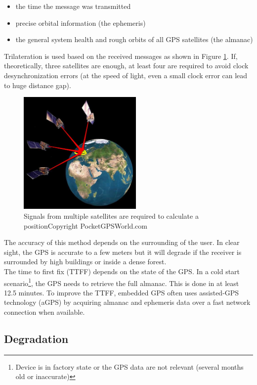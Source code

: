 \begin{itemize}
\item the time the message was transmitted
\item precise orbital information (the ephemeris)
\item the general system health and rough orbits of all GPS satellites (the almanac)
\end{itemize}

Trilateration is used based on the received messages as shown in Figure \ref{fig:gps-earth}.
If, theoretically, three satellites are enough, at least four are required to avoid clock desynchronization errors (at the speed of light, even a small clock error can lead to huge distance gap).\\

\begin{figure}[h]
  \centering
  \includegraphics[width=6cm]{images/gps.jpg}
  \caption{Signals from multiple satellites are required to calculate a position\newline Copyright PocketGPSWorld.com}
  \label{fig:gps-earth}
\end{figure}


The accuracy of this method depends on the surrounding of the user.
In clear sight, the GPS is accurate to a few meters but it will degrade if the receiver is surrounded by high buildings or inside a dense forest.\\

The time to first fix (TTFF) depends on the state of the GPS.
In a cold start scenario\footnote{Device is in factory state or the GPS data are not relevant (several months old or inaccurate)}, the GPS needs to retrieve the full almanac.
This is done in at least 12.5 minutes\cite{gpsuser}.
To improve the TTFF, embedded GPS often uses assisted-GPS technology (aGPS) by acquiring almanac and ephemeris data over a fast network connection when available.

\subsection{Degradation}

